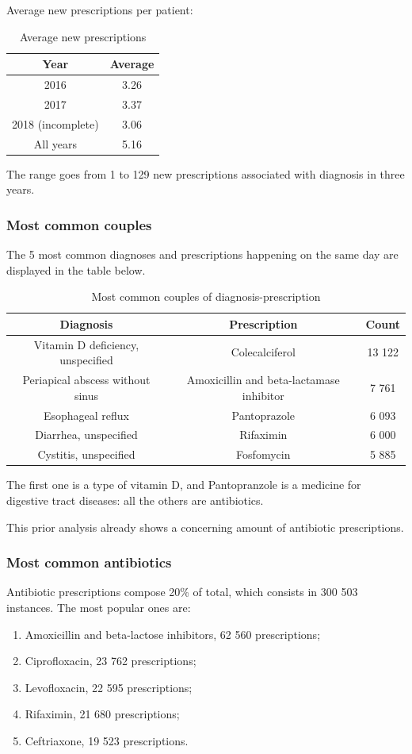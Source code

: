 Average new prescriptions per patient:
\begin{table}[h]
	\centering
	\begin{tabular}{c|c}
		\textbf{Year} & \textbf{Average} \\
		\hline
		2016 & 3.26 \\
		\hline
		2017 & 3.37 \\
		\hline
		2018 (incomplete) & 3.06 \\
		\hline
		All years & 5.16
	\end{tabular}
	\caption{\small Average new prescriptions}
\end{table}

The range goes from 1 to 129 new prescriptions associated with diagnosis in three years.

\subsubsection{Most common couples}
The 5 most common diagnoses and prescriptions happening on the same day are displayed in the table below.
\begin{table}[h]
	\centering
	\begin{tabular}{c|c|c}
		\textbf{Diagnosis} & \textbf{Prescription} & \textbf{Count} \\
		\hline
		Vitamin D deficiency, unspecified & Colecalciferol & 13 122 \\
		\hline
		Periapical abscess without sinus & Amoxicillin and beta-lactamase inhibitor & 7 761 \\
		\hline
		Esophageal reflux & Pantoprazole & 6 093 \\
		\hline
		Diarrhea, unspecified & Rifaximin & 6 000 \\
		\hline
		Cystitis, unspecified & Fosfomycin & 5 885 \\
	\end{tabular}
	\caption{\small Most common couples of diagnosis-prescription}
\end{table}

The first one is a type of vitamin D, and Pantopranzole is a medicine for digestive tract diseases: all the others are antibiotics. 

This prior analysis already shows a concerning amount of antibiotic prescriptions. 

\subsubsection{Most common antibiotics}
Antibiotic prescriptions compose 20\% of total, which consists in 300 503 instances. The most popular ones are:
\begin{enumerate}
	\item Amoxicillin and beta-lactose inhibitors, 62 560 prescriptions;
	\item Ciprofloxacin, 23 762 prescriptions;
	\item Levofloxacin, 22 595 prescriptions;
	\item Rifaximin, 21 680 prescriptions;
	\item Ceftriaxone, 19 523 prescriptions.
\end{enumerate}


